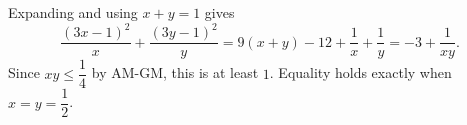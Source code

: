 Expanding and using $x+y=1$ gives
\[
\dfrac{(3x-1)^2}{x}+\dfrac{(3y-1)^2}{y}
=9(x+y)-12+\dfrac{1}{x}+\dfrac{1}{y}=-3+\dfrac{1}{xy}.
\]
Since $xy\le\dfrac{1}{4}$ by AM-GM, this is at least $1$. Equality holds exactly when $\boxed{x=y=\dfrac{1}{2}}$.
